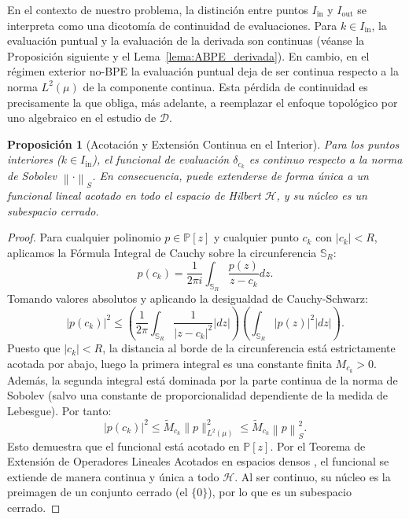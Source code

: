 \documentclass[12pt,a4paper]{article}
\newtheorem{proposition}{Proposición}
\theoremstyle{definition}
\theoremstyle{remark}
\newcommand{\Poly}{\mathbb{P}[z]}
\newcommand{\norm}[1]{\left\| #1 \right\|_S}
\newcommand{\abs}[1]{\left| #1 \right|}
\newcommand{\D}{\mathcal{D}}
\begin{document}
En el contexto de nuestro problema, la distinción entre puntos $I_{\mathrm{in}}$ y $I_{\mathrm{out}}$ se interpreta como una dicotomía de continuidad de evaluaciones. Para $k\in I_{\mathrm{in}}$, la evaluación puntual y la evaluación de la derivada son continuas (véanse la Proposición siguiente y el Lema~\ref{lema:ABPE_derivada}). En cambio, en el régimen exterior no-BPE la evaluación puntual deja de ser continua respecto a la norma $L^2(\mu)$ de la componente continua. Esta pérdida de continuidad es precisamente la que obliga, más adelante, a reemplazar el enfoque topológico por uno algebraico en el estudio de $\D$.

\begin{proposition}[Acotación y Extensión Continua en el Interior]
  Para los puntos interiores ($k \in I_{\mathrm{in}}$), el funcional de evaluación $\delta_{c_k}$ es continuo respecto a la norma de Sobolev $\norm{\cdot}$. En consecuencia, puede extenderse de forma única a un funcional lineal acotado en todo el espacio de Hilbert $\mathcal{H}$, y su núcleo es un subespacio cerrado.
\end{proposition}

\begin{proof}
  Para cualquier polinomio $p \in \Poly$ y cualquier punto $c_k$ con $\abs{c_k} < R$, aplicamos la Fórmula Integral de Cauchy sobre la circunferencia $\mathbb{S}_R$:
  $$ p(c_k) = \frac{1}{2\pi i} \int_{\mathbb{S}_R} \frac{p(z)}{z - c_k} dz. $$
  Tomando valores absolutos y aplicando la desigualdad de Cauchy-Schwarz:
  $$ \abs{p(c_k)}^2 \leq \left( \frac{1}{2\pi} \int_{\mathbb{S}_R} \frac{1}{\abs{z - c_k}^2} \abs{dz} \right) \left( \int_{\mathbb{S}_R} \abs{p(z)}^2 \abs{dz} \right). $$
  Puesto que $\abs{c_k} < R$, la distancia al borde de la circunferencia está estrictamente acotada por abajo, luego la primera integral es una constante finita $M_{c_k} > 0$. Además, la segunda integral está dominada por la parte continua de la norma de Sobolev (salvo una constante de proporcionalidad dependiente de la medida de Lebesgue). Por tanto:
  $$ \abs{p(c_k)}^2 \leq \tilde{M}_{c_k} \|p\|_{L^2(\mu)}^2 \leq \tilde{M}_{c_k} \norm{p}^2. $$
  Esto demuestra que el funcional está acotado en $\Poly$. Por el Teorema de Extensión de Operadores Lineales Acotados en espacios densos \cite{kreyszig1989introductory}, el funcional se extiende de manera continua y única a todo $\mathcal{H}$. Al ser continuo, su núcleo es la preimagen de un conjunto cerrado (el $\{0\}$), por lo que es un subespacio cerrado.
\end{proof}
\end{document}
